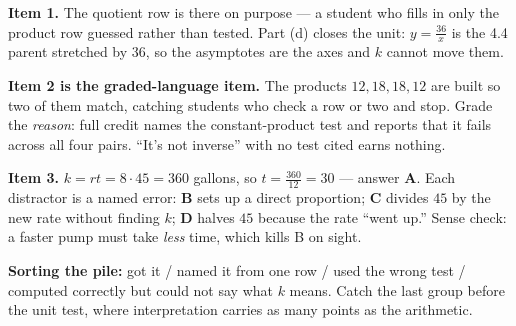 \documentclass[10pt]{article}
\begin{document}
\begin{teachernote}
\textbf{Item 1.} The quotient row is there on purpose --- a student who fills in only the product row
guessed rather than tested. Part (d) closes the unit: $y=\frac{36}{x}$ is the 4.4 parent stretched by
$36$, so the asymptotes are the axes and $k$ cannot move them.

\vspace{2pt}
\textbf{Item 2 is the graded-language item.} The products $12, 18, 18, 12$ are built so two of them
match, catching students who check a row or two and stop. Grade the \emph{reason}: full credit names
the constant-product test and reports that it fails across all four pairs. ``It's not inverse'' with no
test cited earns nothing.

\vspace{2pt}
\textbf{Item 3.} $k=rt=8\cdot45=360$ gallons, so $t=\frac{360}{12}=30$ --- answer \textbf{A}. Each
distractor is a named error: \textbf{B} sets up a direct proportion; \textbf{C} divides $45$ by the new
rate without finding $k$; \textbf{D} halves $45$ because the rate ``went up.'' Sense check: a faster
pump must take \emph{less} time, which kills B on sight.

\vspace{2pt}
\textbf{Sorting the pile:} got it / named it from one row / used the wrong test / computed correctly but
could not say what $k$ means. Catch the last group before the unit test, where interpretation carries
as many points as the arithmetic.
\end{teachernote}
\end{document}

